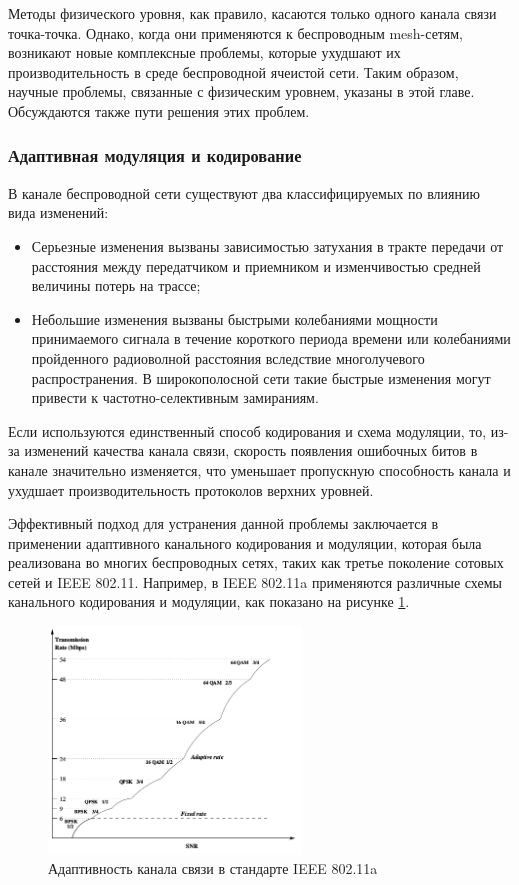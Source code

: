 \documentclass[14pt,a4paper,titlepage]{extarticle}
\begin{document}
Методы физического уровня, как правило, касаются только одного канала связи точка-точка. Однако, когда они применяются к беспроводным mesh-сетям, возникают новые комплексные проблемы, которые ухудшают их производительность в среде беспроводной ячеистой сети. Таким образом, научные проблемы, связанные с физическим уровнем, указаны в этой главе. Обсуждаются также пути решения этих проблем.

\subsubsection{Адаптивная модуляция и кодирование}
В канале беспроводной сети существуют два классифицируемых по влиянию вида изменений:
\begin{itemize}
\item Серьезные изменения вызваны зависимостью затухания в тракте передачи от расстояния между передатчиком и приемником и изменчивостью средней величины потерь на трассе;
\item Небольшие изменения вызваны быстрыми колебаниями мощности принимаемого сигнала в течение короткого периода времени или колебаниями пройденного радиоволной расстояния вследствие многолучевого распространения. В широкополосной сети такие быстрые изменения могут привести к частотно-селективным замираниям.
\end{itemize}

Если используются единственный способ кодирования и схема модуляции, то, из-за изменений качества канала связи, скорость появления ошибочных битов в канале значительно изменяется, что уменьшает пропускную способность канала и ухудшает производительность протоколов верхних уровней.

Эффективный подход для устранения данной проблемы заключается в применении адаптивного канального кодирования и модуляции, которая была реализована во многих беспроводных сетях, таких как третье поколение сотовых сетей и IEEE 802.11. Например, в IEEE 802.11a применяются различные схемы канального кодирования и модуляции, как показано на рисунке \ref{fig:adaptive_modulation_and_coding}.

\begin{figure}
\centering
\includegraphics[width=0.6\textwidth]{Adaptive_modulation_and_coding_802_11}
\caption{Адаптивность канала связи в стандарте IEEE 802.11a}
\label{fig:adaptive_modulation_and_coding}
\end{figure}
\end{document}
